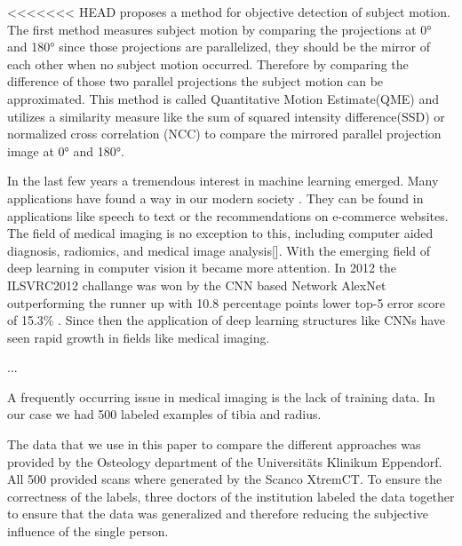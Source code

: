 \documentclass[
a4paper, 
12pt,
grayscalebody, %
abstract=on,
twoside, BCOR10mm, 12pt, DIV13,headinclude, footexclude, final, abstracton, openright
]{ibireprt}
\numberwithin{equation}{chapter}
\numberwithin{table}{chapter}
\numberwithin{figure}{chapter}
\numberwithin{algorithm}{chapter}
\numberwithin{example}{chapter}
\numberwithin{example}{chapter}
\begin{document}
<<<<<<< HEAD
\cite{Walle2023} proposes a method for objective detection of subject motion. The first method measures subject motion by comparing the projections at 0° and 180° since those projections are parallelized, they should be the mirror of each other when no subject motion occurred. Therefore by comparing the difference of those two parallel projections the subject motion can be approximated. This method is called Quantitative Motion Estimate(QME) and utilizes a similarity measure like the sum of squared intensity difference(SSD) or normalized cross correlation (NCC) to compare the mirrored parallel projection image at 0° and 180°.%

In the last few years a tremendous interest in machine learning emerged. Many applications have found a way in our modern society \cite{LeCun2015}. They can be found in applications like speech to text or the recommendations on e-commerce websites. The field of medical imaging is no exception to this, including computer aided diagnosis, radiomics, and medical image analysis[]. %
With the emerging field of deep learning in computer vision it became more attention. In 2012 the ILSVRC2012 challange  was won by the CNN based Network AlexNet outperforming the runner up with 10.8 percentage points lower top-5 error score of 15.3\% . Since then the application of deep learning structures like CNNs have seen rapid growth in fields like medical imaging. 

 ...\cite{Yamashita2018} %


A frequently occurring issue in medical imaging is the lack of training data. In our case we had 500 labeled examples of tibia and radius.

The data that we use in this paper to compare the different approaches was provided by the Osteology department of the Universitäts Klinikum Eppendorf. All 500 provided scans where generated by the Scanco XtremCT. %
To ensure the correctness of the labels, three doctors of the institution labeled the data together to ensure that the data was generalized and therefore reducing the subjective influence of the single person.  
\end{document}
